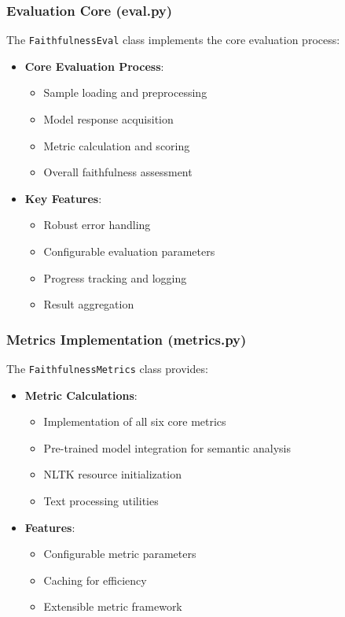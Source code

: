 \subsubsection{Evaluation Core (eval.py)}
The \texttt{FaithfulnessEval} class implements the core evaluation process:
\begin{itemize}
    \item \textbf{Core Evaluation Process}:
    \begin{itemize}
        \item Sample loading and preprocessing
        \item Model response acquisition
        \item Metric calculation and scoring
        \item Overall faithfulness assessment
    \end{itemize}
    \item \textbf{Key Features}:
    \begin{itemize}
        \item Robust error handling
        \item Configurable evaluation parameters
        \item Progress tracking and logging
        \item Result aggregation
    \end{itemize}
\end{itemize}

\subsubsection{Metrics Implementation (metrics.py)}
The \texttt{FaithfulnessMetrics} class provides:
\begin{itemize}
    \item \textbf{Metric Calculations}:
    \begin{itemize}
        \item Implementation of all six core metrics
        \item Pre-trained model integration for semantic analysis
        \item NLTK resource initialization
        \item Text processing utilities
    \end{itemize}
    \item \textbf{Features}:
    \begin{itemize}
        \item Configurable metric parameters
        \item Caching for efficiency
        \item Extensible metric framework
    \end{itemize}
\end{itemize}

